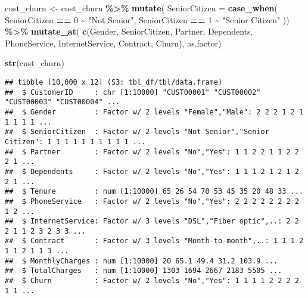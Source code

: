 \documentclass[
]{article}
\newenvironment{Shaded}{\begin{snugshade}}{\end{snugshade}}
\newcommand{\AttributeTok}[1]{\textcolor[rgb]{0.13,0.29,0.53}{#1}}
\newcommand{\DecValTok}[1]{\textcolor[rgb]{0.00,0.00,0.81}{#1}}
\newcommand{\FunctionTok}[1]{\textcolor[rgb]{0.13,0.29,0.53}{\textbf{#1}}}
\newcommand{\NormalTok}[1]{#1}
\newcommand{\OtherTok}[1]{\textcolor[rgb]{0.56,0.35,0.01}{#1}}
\newcommand{\SpecialCharTok}[1]{\textcolor[rgb]{0.81,0.36,0.00}{\textbf{#1}}}
\newcommand{\StringTok}[1]{\textcolor[rgb]{0.31,0.60,0.02}{#1}}
\begin{document}
\begin{Shaded}
\begin{Highlighting}[]
\NormalTok{cust\_churn }\OtherTok{\textless{}{-}}\NormalTok{ cust\_churn }\SpecialCharTok{\%\textgreater{}\%} \FunctionTok{mutate}\NormalTok{( }\AttributeTok{SeniorCitizen =} \FunctionTok{case\_when}\NormalTok{(}
\NormalTok{                                                               SeniorCitizen }\SpecialCharTok{==} \DecValTok{0} \SpecialCharTok{\textasciitilde{}} \StringTok{"Not Senior"}\NormalTok{,}
\NormalTok{                                                               SeniorCitizen }\SpecialCharTok{==} \DecValTok{1} \SpecialCharTok{\textasciitilde{}} \StringTok{"Senior Citizen"}
\NormalTok{                                                               )) }\SpecialCharTok{\%\textgreater{}\%}
  \FunctionTok{mutate\_at}\NormalTok{( }\FunctionTok{c}\NormalTok{(}\StringTok{\textquotesingle{}Gender\textquotesingle{}}\NormalTok{, }\StringTok{\textquotesingle{}SeniorCitizen\textquotesingle{}}\NormalTok{, }\StringTok{\textquotesingle{}Partner\textquotesingle{}}\NormalTok{, }\StringTok{\textquotesingle{}Dependents\textquotesingle{}}\NormalTok{, }\StringTok{\textquotesingle{}PhoneService\textquotesingle{}}\NormalTok{, }\StringTok{\textquotesingle{}InternetService\textquotesingle{}}\NormalTok{, }\StringTok{\textquotesingle{}Contract\textquotesingle{}}\NormalTok{, }\StringTok{\textquotesingle{}Churn\textquotesingle{}}\NormalTok{), as.factor)}

\FunctionTok{str}\NormalTok{(cust\_churn)}
\end{Highlighting}
\end{Shaded}

\begin{verbatim}
## tibble [10,000 x 12] (S3: tbl_df/tbl/data.frame)
##  $ CustomerID     : chr [1:10000] "CUST00001" "CUST00002" "CUST00003" "CUST00004" ...
##  $ Gender         : Factor w/ 2 levels "Female","Male": 2 2 2 1 2 1 1 1 1 1 ...
##  $ SeniorCitizen  : Factor w/ 2 levels "Not Senior","Senior Citizen": 1 1 1 1 1 1 1 1 1 1 ...
##  $ Partner        : Factor w/ 2 levels "No","Yes": 1 1 2 2 1 1 2 2 2 1 ...
##  $ Dependents     : Factor w/ 2 levels "No","Yes": 1 1 1 2 1 2 1 2 2 1 ...
##  $ Tenure         : num [1:10000] 65 26 54 70 53 45 35 20 48 33 ...
##  $ PhoneService   : Factor w/ 2 levels "No","Yes": 2 2 2 2 2 2 2 2 1 2 ...
##  $ InternetService: Factor w/ 3 levels "DSL","Fiber optic",..: 2 2 2 1 1 2 3 2 3 3 ...
##  $ Contract       : Factor w/ 3 levels "Month-to-month",..: 1 1 1 2 1 1 2 1 1 3 ...
##  $ MonthlyCharges : num [1:10000] 20 65.1 49.4 31.2 103.9 ...
##  $ TotalCharges   : num [1:10000] 1303 1694 2667 2183 5505 ...
##  $ Churn          : Factor w/ 2 levels "No","Yes": 1 1 1 1 2 2 2 2 1 1 ...
\end{verbatim}
\end{document}
